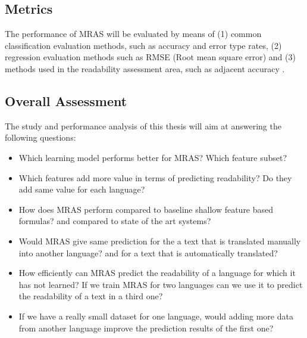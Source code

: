 \documentclass[12pt]{article}
\begin{document}

\subsection{Metrics}
The performance of MRAS will be evaluated by means of (1) common classification evaluation methods, such as accuracy and error type rates, (2) regression evaluation methods such as RMSE (Root mean square error) and (3) methods used in the readability assessment area, such as adjacent accuracy \cite{franccois2012ai}. 

\subsection{Overall Assessment}
The study and performance analysis of this thesis will aim at answering the following questions:
\begin{itemize}

\item Which learning model performs better for MRAS? Which feature subset?
\item Which features add more value in terms of predicting readability? Do they add same value for each language?
\item How does MRAS perform compared to baseline shallow feature based formulas? and compared to state of the art systems?
\item Would MRAS give same prediction for the a text that is translated manually into another language? and for a text that is automatically translated?
\item How efficiently can MRAS predict the readability of a language for which it has not learned? If we train MRAS for two languages can we use it to predict the readability of a text in a third one?
\item If we have a really small dataset for one language, would adding more data from another language improve the prediction results of the first one?

\end{itemize}
\end{document}
